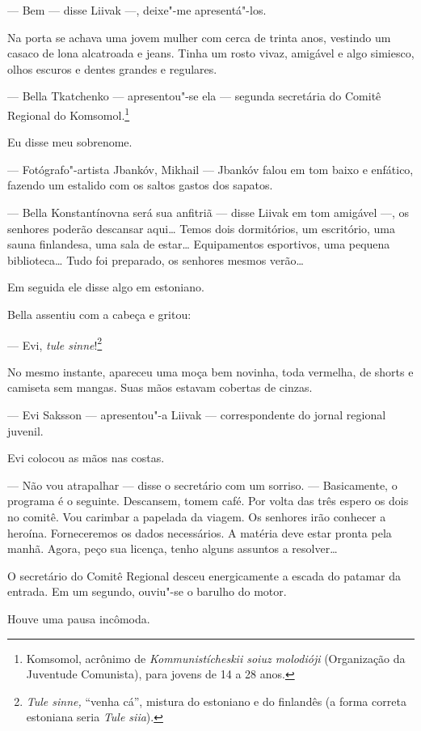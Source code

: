 --- Bem --- disse Liivak ---, deixe"-me
apresentá"-los.

Na porta se achava uma jovem mulher com cerca de trinta anos, vestindo
um casaco de lona alcatroada e jeans. Tinha um rosto vivaz, amigável e
algo simiesco, olhos escuros e dentes grandes e regulares.

--- Bella Tkatchenko --- apresentou"-se ela ---
segunda secretária do Comitê Regional do Komsomol.\footnote{Komsomol,
  acrônimo de \emph{Kommunistícheskii soiuz molodióji} (Organização da
  Juventude Comunista), para jovens de 14 a 28 anos.}

Eu disse meu sobrenome.

--- Fotógrafo"-artista Jbankóv, Mikhail --- Jbankóv falou
em tom baixo e enfático, fazendo um estalido com os saltos gastos dos
sapatos.

--- Bella Konstantínovna será sua anfitriã --- disse
Liivak em tom amigável ---, os senhores poderão descansar aqui\ldots{}
Temos dois dormitórios, um escritório, uma sauna finlandesa, uma sala de
estar\ldots{} Equipamentos esportivos, uma pequena biblioteca\ldots{} Tudo foi
preparado, os senhores mesmos verão\ldots{}

Em seguida ele disse algo em estoniano.

Bella assentiu com a cabeça e gritou:

--- Evi, \emph{tule sinne}!\footnote{\emph{Tule sinne,} ``venha
  cá'', mistura do estoniano e do finlandês (a forma correta estoniana
  seria \emph{Tule siia}).}

No mesmo instante, apareceu uma moça bem novinha, toda vermelha, de
shorts e camiseta sem mangas. Suas mãos estavam cobertas de cinzas.

--- Evi Saksson --- apresentou"-a Liivak ---
correspondente do jornal regional juvenil.

Evi colocou as mãos nas costas.

--- Não vou atrapalhar --- disse o secretário com um
sorriso. --- Basicamente, o programa é o seguinte. Descansem,
tomem café. Por volta das três espero os dois no comitê. Vou carimbar a
papelada da viagem. Os senhores irão conhecer a heroína. Forneceremos os
dados necessários. A matéria deve estar pronta pela manhã. Agora, peço
sua licença, tenho alguns assuntos a resolver\ldots{}

O secretário do Comitê Regional desceu energicamente a escada do patamar
da entrada. Em um segundo, ouviu"-se o barulho do motor.

Houve uma pausa incômoda.

